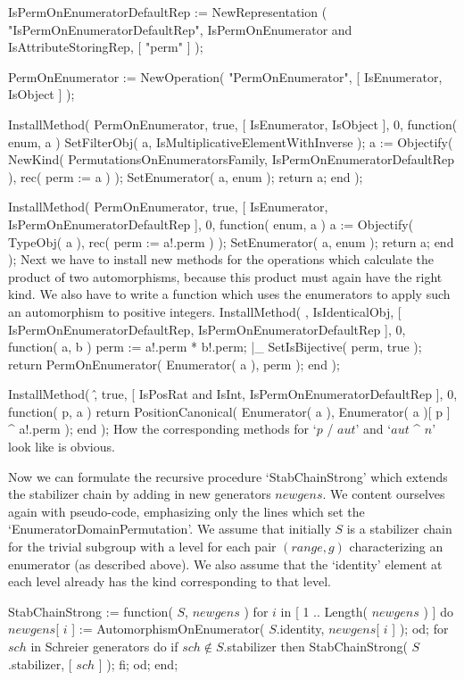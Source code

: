 IsPermOnEnumeratorDefaultRep := NewRepresentation
    ( "IsPermOnEnumeratorDefaultRep",
      IsPermOnEnumerator and IsAttributeStoringRep,
      [ "perm" ] );

PermOnEnumerator := NewOperation( "PermOnEnumerator",
    [ IsEnumerator, IsObject ] );

InstallMethod( PermOnEnumerator, true,
        [ IsEnumerator, IsObject ], 0,
    function( enum, a )
    SetFilterObj( a, IsMultiplicativeElementWithInverse );
    a := Objectify( NewKind( PermutationsOnEnumeratorsFamily,
                 IsPermOnEnumeratorDefaultRep ),
                 rec( perm := a ) );
    SetEnumerator( a, enum );
    return a;
end );

InstallMethod( PermOnEnumerator, true,
        [ IsEnumerator, IsPermOnEnumeratorDefaultRep ], 0,
    function( enum, a )
    a := Objectify( TypeObj( a ), rec( perm := a!.perm ) );
    SetEnumerator( a, enum );
    return a;
end );
\endtt
Next we  have to install new  methods for the  operations which calculate
the  product of two automorphisms, because   this product must again have
the    right kind. We    also have to write  a    function which uses the
enumerators to apply such an automorphism to positive integers.
\begintt
InstallMethod( \*, IsIdenticalObj,
        [ IsPermOnEnumeratorDefaultRep, IsPermOnEnumeratorDefaultRep ], 0,
    function( a, b )
    perm := a!.perm * b!.perm;
|_
    SetIsBijective( perm, true );
    return PermOnEnumerator( Enumerator( a ), perm );
end );

InstallMethod( \^, true,
        [ IsPosRat and IsInt, IsPermOnEnumeratorDefaultRep ], 0,
    function( p, a )
    return PositionCanonical( Enumerator( a ),
                   Enumerator( a )[ p ] ^ a!.perm );
end );
\endtt
How the corresponding  methods for `$p$ /  $aut$' and `$aut$  ^ $n$' look
like is obvious.

Now we  can  formulate  the recursive procedure   `StabChainStrong' which
extends  the stabilizer chain by adding  in new  generators $newgens$. We
content  ourselves again   with pseudo-code, emphasizing  only  the lines
which set the `EnumeratorDomainPermutation'. We assume that initially $S$
is a stabilizer chain for the trivial subgroup with a level for each pair
$(range,g)$ characterizing an enumerator  (as  described above). We  also
assume that  the `identity'  element at each  level already  has the kind
corresponding to that level.

\)StabChainStrong := function( $S$, $newgens$ )
\)\quad for $i$  in [ 1 .. Length( $newgens$ ) ]  do
\)\qquad $newgens$[ $i$ ] := AutomorphismOnEnumerator( $S$.identity, %
         $newgens$[ $i$ ] );
\)\quad od;
\)
\)\quad for $sch$  in {\rm Schreier generators}  do
\)\qquad if $sch \notin S$.stabilizer  then
\)\qquad\quad StabChainStrong( $S$.stabilizer, [ $sch$ ] );
\)\qquad fi;
\)\quad od;
\)end;

